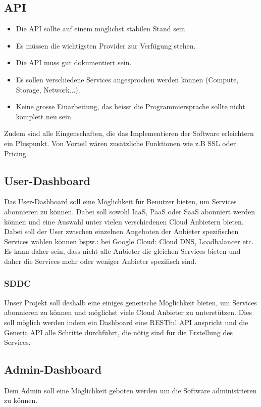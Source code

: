 

\subsection{API}
\begin{itemize}
\item Die API sollte auf einem möglichst stabilen Stand sein.
\item Es müssen die wichtigsten Provider zur Verfügung stehen.
\item Die API muss gut dokumentiert sein.
\item Es sollen verschiedene Services angesprochen werden können (Compute, Storage, Network...).
\item Keine grosse Einarbeitung, das heisst die Programmiersprache sollte nicht komplett neu sein.
\end{itemize}
Zudem sind alle Eingenschaften, die das Implementieren der Software erleichtern ein 
Pluspunkt. Von Vorteil wären zusätzliche Funktionen wie z.B SSL oder Pricing. 

\subsection{User-Dashboard}
Das User-Dashboard soll eine Möglichkeit für Benutzer bieten, um Services 
abonnieren zu können.
Dabei soll sowohl \ac{IaaS}, \ac{PaaS} oder \ac{SaaS} abonniert werden können und eine Auswahl 
 unter vielen verschiedenen Cloud Anbietern bieten.
Dabei soll der User zwischen einzelnen Angeboten der Anbieter spezifischen 
Services wählen können bspw.: bei Google Cloud: Cloud DNS, Loadbalancer etc.
Es kann daher sein, dass nicht alle Anbieter die gleichen Services bieten und 
daher die Services mehr oder weniger Anbieter spezifisch sind.

\subsubsection{SDDC}
Unser Projekt soll deshalb eine einiges generische Möglichkeit bieten, um 
Services abonnieren zu können und möglichst viele Cloud Anbieter zu 
unterstützen.
Dies soll möglich werden indem ein Dashboard eine RESTful API anspricht und 
die Generic API alle Schritte durchführt, die nötig sind für die Erstellung des 
Services.

\subsection{Admin-Dashboard}
Dem Admin soll eine Möglichkeit geboten werden um die Software administrieren zu 
können.
